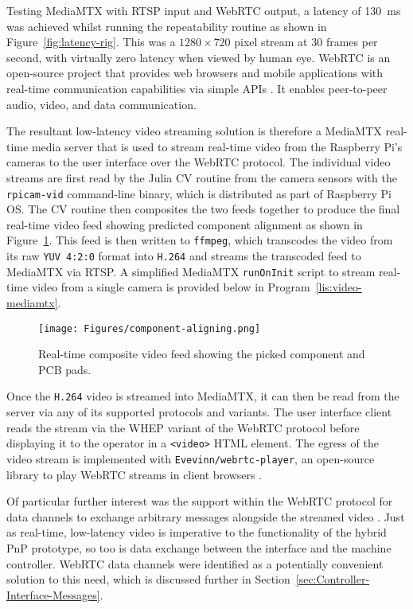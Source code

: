 \documentclass[12pt,british,UKenglish]{article}
\begin{document}
Testing MediaMTX with \ac{RTSP} input and \ac{WebRTC} output, a latency of \qty{130}{\milli\second} was achieved whilst running the repeatability routine as shown in Figure~\ref{fig:latency-rig}.
This was a $1280\times720$ pixel stream at 30 frames per second, with virtually zero latency when viewed by human eye.
\ac{WebRTC} is an open-source project that provides web browsers and mobile applications with real-time communication capabilities via simple \acp{API} \cite{webrtc,mozillaWebRTCAPIs}.
It enables peer-to-peer audio, video, and data communication.


The resultant low-latency video streaming solution is therefore a MediaMTX real-time media server that is used to stream real-time video from the Raspberry Pi's cameras to the user interface over the \ac{WebRTC} protocol.
The individual video streams are first read by the Julia \ac{CV} routine from the camera sensors with the \texttt{rpicam-vid} command-line binary, which is distributed as part of Raspberry Pi OS.
The \ac{CV} routine then composites the two feeds together to produce the final real-time video feed showing predicted component alignment as shown in Figure~\ref{fig:component-aligning}.
This feed is then written to \texttt{ffmpeg}, which transcodes the video from its raw \texttt{YUV 4:2:0} format into \texttt{H.264} and streams the transcoded feed to MediaMTX via \ac{RTSP}.
A simplified MediaMTX \texttt{runOnInit} script to stream real-time video from a single camera is provided below in Program~\ref{lis:video-mediamtx}.
\begin{figure}[hbtp]
    \texttt{[image: Figures/component-aligning.png]}
    \centering
    \caption{Real-time composite video feed showing the picked component and \ac{PCB} pads.}
    \label{fig:component-aligning}
\end{figure}

Once the \texttt{H.264} video is streamed into MediaMTX, it can then be read from the server via any of its supported protocols and variants.
The user interface client reads the stream via the \ac{WHEP} variant of the \ac{WebRTC} protocol before displaying it to the operator in a \texttt{<video>} \ac{HTML} element.
The egress of the video stream is implemented with \texttt{Evevinn/webrtc-player}, an open-source library to play \ac{WebRTC} streams in client browsers \cite{webrtc-player}.

Of particular further interest was the support within the \ac{WebRTC} protocol for data channels to exchange arbitrary messages alongside the streamed video \cite{13807501}.
Just as real-time, low-latency video is imperative to the functionality of the hybrid \acl{PnP} prototype, so too is data exchange between the interface and the machine controller.
\ac{WebRTC} data channels were identified as a potentially convenient solution to this need, which is discussed further in Section~\ref{sec:Controller-Interface-Messages}.
\end{document}
